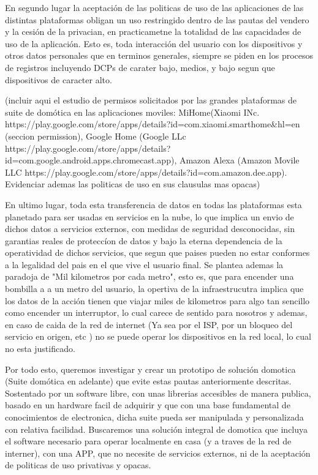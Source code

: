 En segundo lugar la aceptación de las politicas de uso de las aplicaciones de las distintas plataformas obligan un uso restringido dentro de las pautas del vendero y la cesión de la privacian, en practicametne la totalidad de las capacidades de uso de la aplicación. Esto es, toda interacción del usuario con los dispositivos y otros datos personales que en terminos generales, siempre se piden en los procesos de registros incluyendo DCPs de carater bajo, medios, y bajo segun que dispositivos de caracter alto.

(incluir aqui el estudio de permisos solicitados por las grandes plataformas de suite de domótica en las aplicaciones moviles: MiHome(Xiaomi INc. https://play.google.com/store/apps/details?id=com.xiaomi.smarthome&hl=en (seccion permission), Google Home (Google LLc https://play.google.com/store/apps/details?id=com.google.android.apps.chromecast.app), Amazon Alexa (Amazon Movile LLC https://play.google.com/store/apps/details?id=com.amazon.dee.app). Evidenciar ademas las politicas de uso en sus clausulas mas opacas)

En ultimo lugar, toda esta transferencia de datos en todas las plataformas esta planetado para ser usadas en servicios en la nube, lo que implica un envio de dichos datos a servicios externos, con medidas de seguridad desconocidas, sin garantias reales de proteccíon de datos y bajo la eterna dependencia de la operatividad de dichos servicios, que segun que paises pueden no estar conformes a la legalidad del pais en el que vive el usuario final. Se plantea ademas la paradoja de "Mil kilometros por cada metro", esto es, que para encender una bombilla a a un metro del usuario, la opertiva de la infraestrucutra implica que los datos de la acción tienen que viajar miles de kilometros para algo tan sencillo como encender un interruptor, lo cual carece de sentido para nosotros y ademas, en caso de caida de la red de internet (Ya sea por el ISP, por un bloqueo del servicio en origen, etc ) no se puede operar los dispositivos en la red local, lo cual no esta justificado.


Por todo esto, queremos investigar y crear un prototipo de solución domotica (Suite domótica en adelante) que evite estas pautas anteriormente descritas. Sostentado por un software libre, con unas librerias accesibles de manera publica, basado en un hardware facil de adquirir y que con una base fundamental de conocimientos de electronica, dicha suite pueda ser  manipulada y personalizada con relativa facilidad. Buscaremos una solución integral de domotica que incluya el software necesario para operar localmente en casa (y a traves de la red de interner), con una APP, que no necesite de servicios externos, ni de la aceptación de politicas de uso privativas y opacas.

